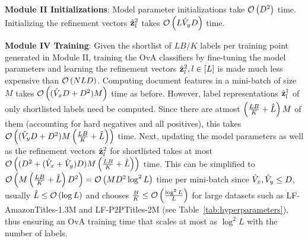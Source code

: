 \textbf{Module II Initializations}: Model parameter initializations take ${\mathcal O}\left({{D^2}}\right)$ time. Initializing the refinement vectors $\hat{\protect{\mathbf{z}}}^2_l$ takes ${\mathcal O}\left({{L\hat V_y D}}\right)$ time. 

\textbf{Module IV Training}: Given the shortlist of $LB/K$ labels per training point generated in Module II, training the OvA classifiers by fine-tuning the model parameters and learning the refinement vectors $\hat{\protect{\mathbf{z}}}^2_l, l \in [L]$ is made much less expensive than ${\mathcal O}\left({{NLD}}\right)$. Computing document features in a mini-batch of size $M$ takes ${\mathcal O}\left({{(\hat V_x D + D^2)M}}\right)$ time as before. However, label representations $\hat{\protect{\mathbf{z}}}^1_l$ of only shortlisted labels need be computed. Since there are atmost $\left({\frac{LB}K + \hat L}\right)M$ of them (accounting for hard negatives and all positives), this takes ${\mathcal O}\left({{(\hat V_y D + D^2)M\left({\frac{LB}K + \hat L}\right)}}\right)$ time. Next, updating the model parameters as well as the refinement vectors $\hat{\protect{\mathbf{z}}}^2_l$ for shortlisted takes at most ${\mathcal O}\left({{(D^2 + (\hat V_x +  \hat V_y)D)M\left({\frac{LB}K + \hat L}\right)}}\right)$ time. This can be simplified to ${\mathcal O}\left({{M\left({\frac{LB}K + \hat L}\right)D^2}}\right) = {\mathcal O}\left({{MD^2\log^2L}}\right)$ time per mini-batch since $\hat V_x, \hat V_y \leq D$, usually $\hat L \leq {\mathcal O}\left({{\log L}}\right)$ and \alg chooses $\frac BK \leq {\mathcal O}\left({{\frac{\log^2L}L}}\right)$ for large datasets such as LF-AmazonTitles-1.3M and LF-P2PTitles-2M (see Table~\ref{tab:hyperparameters}), thus ensuring an OvA training time that scales at most as $\log^2L$ with the number of labels.

